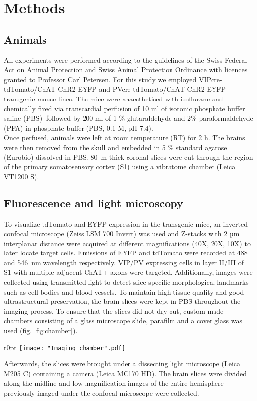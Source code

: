 \chapter{Methods}
\label{ch:methods}
\section{Animals}
\label{sec:animal}
All experiments were performed according to the guidelines of the Swiss Federal Act on Animal Protection and Swiss Animal Protection Ordinance with licences granted to Professor Carl Petersen.
For this study we employed VIPcre-tdTomato/ChAT-ChR2-EYFP and PVcre-tdTomato/ChAT-ChR2-EYFP transgenic mouse lines. 
The mice were anaesthetised with isoflurane and chemically fixed via transcardial perfusion of 10 ml of isotonic phosphate buffer saline (PBS), followed by 200 ml of 1 \% glutaraldehyde and 2\% paraformaldehyde (PFA) in phosphate buffer (PBS, 0.1 M, pH 7.4).\\ 
Once perfused, animals were left at room temperature (RT) for 2 h. The brains were then removed from the skull and embedded in 5 \% standard agarose (Eurobio) dissolved in PBS. 80~\textmu m thick coronal slices were cut through the region of the primary somatosensory cortex (S1) using a vibratome chamber (Leica VT1200 S).
\section{Fluorescence and light microscopy}
\label{sec:FM}
To visualize tdTomato and EYFP expression in the transgenic mice, an inverted confocal microscope (Zeiss LSM 700 Invert) was used and Z-stacks with 2 µm interplanar distance were acquired at different magnifications (40X, 20X, 10X) to later locate target cells. Emissions of EYFP and tdTomato were recorded at 488 and 546~nm wavelength respectively. VIP/PV expressing cells in layer II/III of S1 with multiple adjacent ChAT+ axons were targeted. Additionally, images were collected using transmitted light to detect slice-specific morphological landmarks such as cell bodies and blood vessels. To maintain high tissue quality and good ultrastructural preservation, the brain slices were kept in PBS throughout the imaging process. To ensure that the slices did not dry out, custom-made chambers consisting of a glass microscope slide, parafilm and a cover glass was used (fig. \ref{fig:chamber}). \\
 \begin{wrapfigure}[11]{r}{0pt}
	\centering
	\texttt{[image: "Imaging\_chamber".pdf]}
	\caption[Schematic illustration of the imaging chamber]{Schematic illustration of the imaging chamber}
	\label{fig:chamber}	
\end{wrapfigure}
 Afterwards, the slices were brought under a dissecting light microscope (Leica M205 C) containing a camera (Leica MC170 HD). The brain slices were divided along the midline and low magnification images of the entire hemisphere previously imaged under the confocal microscope were collected.\\

